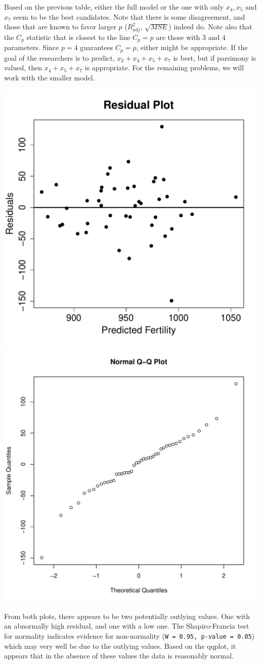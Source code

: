 \documentclass{homework}
\begin{document}
\begin{longproblem}
 Based on the previous table, either the full model or the one with only $x_4,x_5$ and $x_7$ seem to be the best candidates.  Note that there is some disagreement, and those that are known to favor larger $p$ ($R^2_{adj}$, $\sqrt{MSE}$) indeed do. Note also that the $C_p$ statistic that is closest to the line $C_p = p$ are those with $3$ and $4$ parameters.  Since $p=4$ guarantees $C_p = p$, either might be appropriate.  If the goal of the researchers is to predict, $x_2+x_4+x_5+x_7$ is best, but if parsimony is valued, then $x_4+x_5+x_7$ is appropriate. For the remaining problems, we will work with the smaller model. 


\includegraphics[width=.45\textwidth]{resid5.pdf}
\includegraphics[width=.45\textwidth]{qqplot5.pdf}

From both plots, there appears to be two potentially outlying
values.  One with an abnormally high residual, and one with a low
one. The Shapiro-Francia test for normality indicates evidence for
non-normality (\texttt{W = 0.95, p-value = 0.05}) which may very well be due to the outlying values.  Based on the qqplot, it appears that in the absence of these values the data is reasonably normal.


\end{longproblem}
\end{document}
